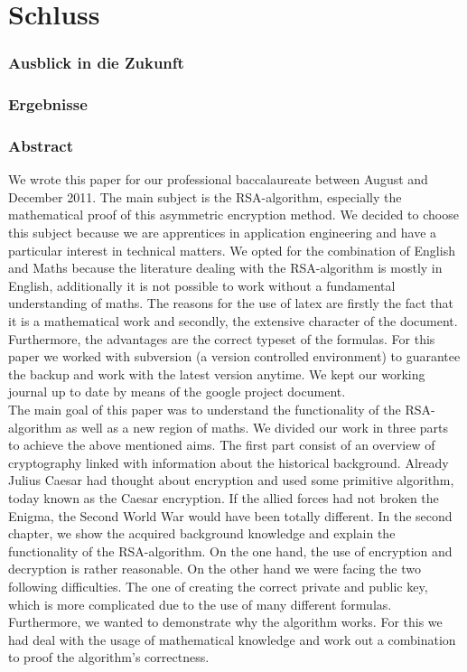 \part{Schluss}
\section{Ausblick in die Zukunft}
\section{Ergebnisse}
\newpage
\section{Abstract}
We wrote this paper for our professional baccalaureate between August and December 2011. The main subject is the RSA-algorithm, especially the mathematical proof of this asymmetric encryption method. We decided to choose this subject because we are apprentices in application engineering and have a particular interest in technical matters. We opted for the combination of English and Maths because the literature dealing with the RSA-algorithm is mostly in English, additionally it is not possible to work without a fundamental understanding of maths. The reasons for the use of latex are firstly the fact that it is a mathematical work and secondly, the extensive character of the document. Furthermore, the advantages are the correct typeset of the formulas. For this paper we worked with subversion (a version controlled environment) to guarantee the backup and work with the latest version anytime. We kept our working journal up to date by means of the google project document. \\
The main goal of this paper was to understand the functionality of the RSA-algorithm as well as a new region of maths. We divided our work in three parts to achieve the above mentioned aims. The first part consist of an overview of cryptography linked with information about the historical background. Already Julius Caesar had thought about encryption and used some primitive algorithm, today known as the Caesar encryption. If the allied forces had not broken the Enigma, the Second World War would have been totally different. %
In the second chapter, we show the acquired background knowledge and explain the functionality of the RSA-algorithm. 
On the one hand, the use of encryption and decryption is rather reasonable. On the other hand we were facing the two following difficulties. The one of creating the correct private and public key, which is more complicated due to the use of many different formulas. Furthermore, we wanted to demonstrate why the algorithm works. For this we had deal with the usage of mathematical knowledge and work out a combination to proof the algorithm's correctness. 
